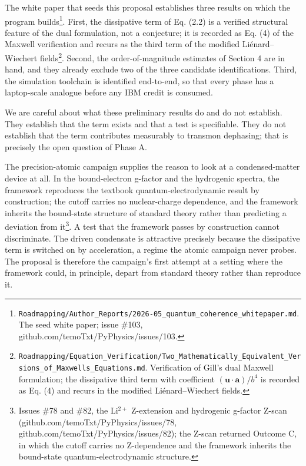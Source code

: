 \documentclass[
  11pt,
]{article}
\begin{document}
The white paper that seeds this proposal establishes three results on
which the program builds\footnote{\texttt{Roadmapping/Author\_Reports/2026-05\_quantum\_coherence\_whitepaper.md}.
  The seed white paper; issue \#103,
  github.com/temoTxt/PyPhysics/issues/103.}. First, the dissipative term
of Eq. (2.2) is a verified structural feature of the dual formulation,
not a conjecture; it is recorded as Eq. (4) of the Maxwell verification
and recurs as the third term of the modified Liénard--Wiechert
fields\footnote{\texttt{Roadmapping/Equation\_Verification/Two\_Mathematically\_Equivalent\_Versions\_of\_Maxwells\_Equations.md}.
  Verification of Gill's dual Maxwell formulation; the dissipative third
  term with coefficient \((\mathbf{u}\!\cdot\!\mathbf{a})/b^4\) is
  recorded as Eq. (4) and recurs in the modified Liénard--Wiechert
  fields.}. Second, the order-of-magnitude estimates of Section 4 are in
hand, and they already exclude two of the three candidate
identifications. Third, the simulation toolchain is identified
end-to-end, so that every phase has a laptop-scale analogue before any
IBM credit is consumed.

We are careful about what these preliminary results do and do not
establish. They establish that the term exists and that a test is
specifiable. They do not establish that the term contributes measurably
to transmon dephasing; that is precisely the open question of Phase A.

The precision-atomic campaign supplies the reason to look at a
condensed-matter device at all. In the bound-electron g-factor and the
hydrogenic spectra, the framework reproduces the textbook
quantum-electrodynamic result by construction; the cutoff carries no
nuclear-charge dependence, and the framework inherits the bound-state
structure of standard theory rather than predicting a deviation from
it\footnote{Issues \#78 and \#82, the Li\(^{2+}\) Z-extension and
  hydrogenic g-factor Z-scan (github.com/temoTxt/PyPhysics/issues/78,
  github.com/temoTxt/PyPhysics/issues/82); the Z-scan returned Outcome
  C, in which the cutoff carries no Z-dependence and the framework
  inherits the bound-state quantum-electrodynamic structure.}. A test
that the framework passes by construction cannot discriminate. The
driven condensate is attractive precisely because the dissipative term
is switched on by acceleration, a regime the atomic campaign never
probes. The proposal is therefore the campaign's first attempt at a
setting where the framework could, in principle, depart from standard
theory rather than reproduce it.
\end{document}

